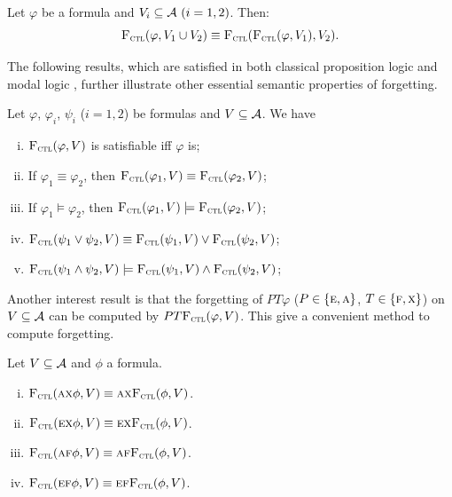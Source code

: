 \documentclass{article}
\begin{document}
\begin{corollary}\label{disTFV}
Let $\varphi$ be a formula and $V_i\subseteq{\cal A}~(i=1,2)$. Then:
\[
{\textsc{F}_{\textsc{ctl}}}(\varphi, V_1 \cup V_2) \equiv {\textsc{F}_{\textsc{ctl}}}({\textsc{F}_{\textsc{ctl}}}(\varphi, V_1), V_2).
\]
\end{corollary}


The following results, which are satisfied in both classical proposition logic and modal logic \SFive, further illustrate other essential semantic properties of forgetting.
\begin{proposition}\label{pro:ctl:forget:1}
Let $\varphi$, $\varphi_i$, $\psi_i$ ($i=1,2$) be formulas and $V\subseteq {\cal A}$. We have
\begin{enumerate}[(i)]
  \item ${\textsc{F}_{\textsc{ctl}}}(\varphi, V)$ is satisfiable iff $\varphi$ is;
  \item If $\varphi_1 \equiv \varphi_2$, then ${\textsc{F}_{\textsc{ctl}}}(\varphi_1, V) \equiv {\textsc{F}_{\textsc{ctl}}}(\varphi_2, V)$;
  \item If $\varphi_1 \models \varphi_2$, then ${\textsc{F}_{\textsc{ctl}}}(\varphi_1, V) \models {\textsc{F}_{\textsc{ctl}}}(\varphi_2, V)$;
  \item ${\textsc{F}_{\textsc{ctl}}}(\psi_1 \vee \psi_2, V) \equiv {\textsc{F}_{\textsc{ctl}}}(\psi_1, V) \vee {\textsc{F}_{\textsc{ctl}}}(\psi_2, V)$;
  \item ${\textsc{F}_{\textsc{ctl}}}(\psi_1 \wedge \psi_2, V) \models {\textsc{F}_{\textsc{ctl}}}(\psi_1, V) \wedge {\textsc{F}_{\textsc{ctl}}}(\psi_2, V)$;
\end{enumerate}
\end{proposition}


Another interest result is that the forgetting of $P T \varphi$ ($P\in \{\textsc{e}, \textsc{a}\}$, $T \in \{\textsc{f}, \textsc{x}\}$) on $V\subseteq {\cal A}$ can be computed by $PT {\textsc{F}_{\textsc{ctl}}}(\varphi, V)$. This give a convenient method to compute forgetting.
\begin{proposition}\label{pro:ctl:forget:2}
  Let $V\subseteq\cal A$ and $\phi$ a formula.%
  \begin{enumerate}[(i)]
    \item ${\textsc{F}_{\textsc{ctl}}}(\textsc{a}\textsc{x}\phi,V)\equiv \textsc{a}\textsc{x} {\textsc{F}_{\textsc{ctl}}}(\phi,V)$.
    \item ${\textsc{F}_{\textsc{ctl}}}(\textsc{e}\textsc{x}\phi,V)\equiv\textsc{e}\textsc{x} {\textsc{F}_{\textsc{ctl}}}(\phi,V)$.
    \item ${\textsc{F}_{\textsc{ctl}}}(\textsc{a} \textsc{f}\phi,V)\equiv \textsc{a} \textsc{f} {\textsc{F}_{\textsc{ctl}}}(\phi,V)$.
    \item ${\textsc{F}_{\textsc{ctl}}}(\textsc{e}\textsc{f}\phi,V)\equiv\textsc{e}\textsc{f} {\textsc{F}_{\textsc{ctl}}}(\phi,V)$.
  \end{enumerate}
\end{proposition}
\end{document}
